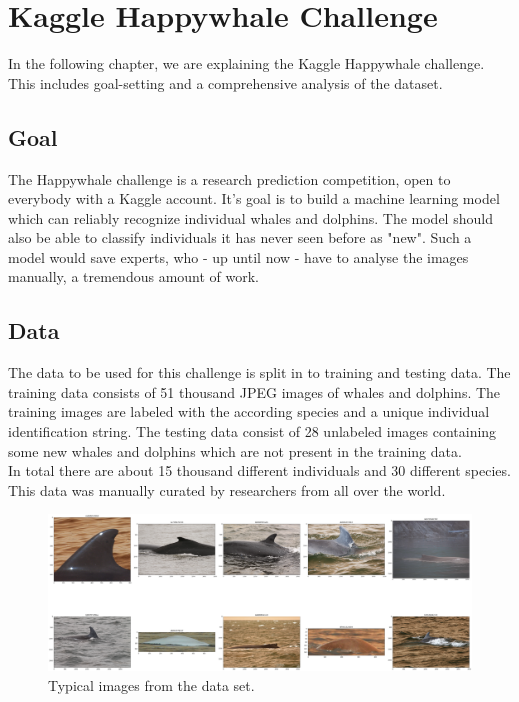 \section{Kaggle Happywhale Challenge}
\label{sec:kagglechallenge}

In the following chapter, we are explaining the Kaggle Happywhale challenge. This includes goal-setting and a comprehensive analysis of the dataset.

\subsection{Goal}
The Happywhale challenge is a research prediction competition, open to everybody with a Kaggle account. It's goal is to build a machine learning model which can reliably recognize individual whales and dolphins. The model should also be able to classify individuals it has never seen before as "new".
Such a model would save experts, who - up until now - have to analyse the images manually, a tremendous amount of work.


\subsection{Data}
The data \cite{kaggle} to be used for this challenge is split in to training and testing data. The training data consists of 51 thousand JPEG images of whales and dolphins. The training images are labeled with the according species and a unique individual identification string. The testing data consist of 28 unlabeled images containing some new whales and dolphins which are not present in the training data.\\
In total there are about 15 thousand different individuals and 30 different species. This data was manually curated by researchers from all over the world.

\begin{figure}[ht] 
        \centering \includegraphics[width=1\columnwidth]{figures/original_images.png}
        \caption{\label{fig:original_images} Typical images from the data set.}
\end{figure}

